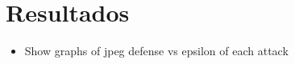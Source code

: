 \section{Resultados}
\begin{itemize}
    \item Show graphs of jpeg defense vs epsilon of each attack 
\end{itemize}